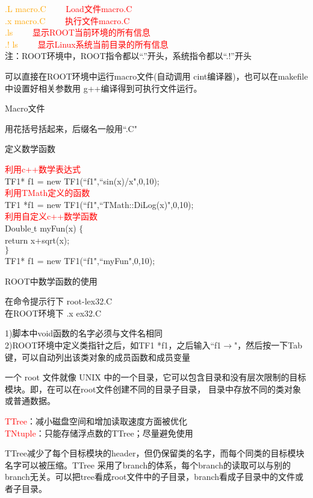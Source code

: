 \documentclass[12pt,a4paper]{article}
\begin{document}
\textcolor{orange}{.L macro.C}   ~~~~\textcolor{red}{Load文件macro.C} \\
\textcolor{orange}{.x macro.C}   ~~~~\textcolor{red}{执行文件macro.C} \\
\textcolor{orange}{.ls}                 ~~~~\textcolor{red}{显示ROOT当前环境的所有信息} \\
\textcolor{orange}{.! ls}               ~~~~\textcolor{red}{显示Linux系统当前目录的所有信息} \\
注：ROOT环境中，ROOT指令都以“.”开头，系统指令都以“.!”开头

可以直接在ROOT环境中运行macro文件(自动调用 cint编译器)，也可以在makefile中设置好相关参数用 g++编译得到可执行文件运行。

Macro文件

用花括号括起来，后缀名一般用``.C"

定义数学函数

\textcolor{red}{利用c++数学表达式} \\
TF1* f1 = new TF1(``f1",``sin(x)/x",0,10); \\
\textcolor{red}{利用TMath定义的函数} \\
TF1 *f1 = new TF1(``f1",``TMath::DiLog(x)",0,10); \\
\textcolor{red}{利用自定义c++数学函数} \\
Double$\_$t myFun(x) $\{$ \\
    return x+sqrt(x); \\
$\}$ \\
TF1* f1 = new TF1(``f1",``myFun",0,10); 

ROOT中数学函数的使用

在命令提示行下 root-lex32.C \\
在ROOT环境下 .x ex32.C

1)脚本中void函数的名字必须与文件名相同 \\
2)ROOT环境中定义类指针之后，如TF1 *f1，之后输入``f1$\rightarrow$"，然后按一下Tab键，可以自动列出该类对象的成员函数和成员变量

一个 root 文件就像 UNIX 中的一个目录，它可以包含目录和没有层次限制的目标模块。即，在可以在root文件创建不同的目录子目录， 目录中存放不同的类对象或普通数据。

\textcolor{red}{TTree}：减小磁盘空间和增加读取速度方面被优化 \\
\textcolor{red}{TNtuple}：只能存储浮点数的TTree；尽量避免使用

TTree减少了每个目标模块的header，但仍保留类的名字，而每个同类的目标模块名字可以被压缩。TTree 采用了branch的体系，每个branch的读取可以与别的branch无关。可以把tree看成root文件中的子目录，branch看成子目录中的文件或者子目录。
\end{document}
